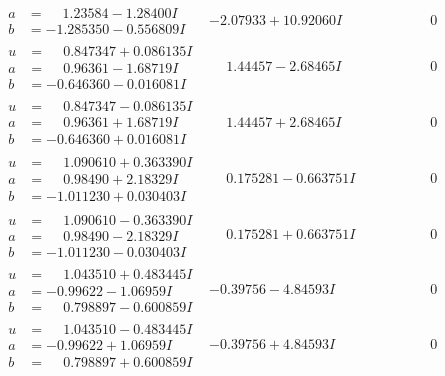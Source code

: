 \documentclass[1p]{elsarticle_modified}
\theoremstyle{definition}
\begin{document}
$$\begin{array}{c|c|c}
\begin{aligned}
a &= \phantom{-}1.23584 - 1.28400 I \\
b &= -1.285350 - 0.556809 I\end{aligned}
 & -2.07933 + 10.92060 I & \phantom{-0.000000 } 0 \\ \hline\begin{aligned}
u &= \phantom{-}0.847347 + 0.086135 I \\
a &= \phantom{-}0.96361 - 1.68719 I \\
b &= -0.646360 - 0.016081 I\end{aligned}
 & \phantom{-}1.44457 - 2.68465 I & \phantom{-0.000000 } 0 \\ \hline\begin{aligned}
u &= \phantom{-}0.847347 - 0.086135 I \\
a &= \phantom{-}0.96361 + 1.68719 I \\
b &= -0.646360 + 0.016081 I\end{aligned}
 & \phantom{-}1.44457 + 2.68465 I & \phantom{-0.000000 } 0 \\ \hline\begin{aligned}
u &= \phantom{-}1.090610 + 0.363390 I \\
a &= \phantom{-}0.98490 + 2.18329 I \\
b &= -1.011230 + 0.030403 I\end{aligned}
 & \phantom{-}0.175281 - 0.663751 I & \phantom{-0.000000 } 0 \\ \hline\begin{aligned}
u &= \phantom{-}1.090610 - 0.363390 I \\
a &= \phantom{-}0.98490 - 2.18329 I \\
b &= -1.011230 - 0.030403 I\end{aligned}
 & \phantom{-}0.175281 + 0.663751 I & \phantom{-0.000000 } 0 \\ \hline\begin{aligned}
u &= \phantom{-}1.043510 + 0.483445 I \\
a &= -0.99622 - 1.06959 I \\
b &= \phantom{-}0.798897 - 0.600859 I\end{aligned}
 & -0.39756 - 4.84593 I & \phantom{-0.000000 } 0 \\ \hline\begin{aligned}
u &= \phantom{-}1.043510 - 0.483445 I \\
a &= -0.99622 + 1.06959 I \\
b &= \phantom{-}0.798897 + 0.600859 I\end{aligned}
 & -0.39756 + 4.84593 I & \phantom{-0.000000 } 0\\

\end{array}$$
\end{document}
